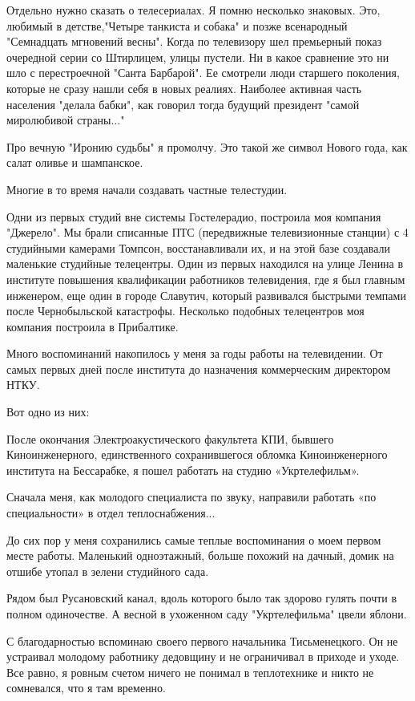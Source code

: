 Отдельно нужно сказать о телесериалах. Я помню несколько знаковых. Это, любимый
в детстве,"Четыре танкиста и собака" и позже всенародный "Семнадцать мгновений
весны". Когда по телевизору шел премьерный показ очередной серии со Штирлицем,
улицы пустели. Ни в какое сравнение это ни шло с перестроечной "Санта
Барбарой". Ее смотрели люди старшего поколения, которые не сразу нашли себя в
новых реалиях. Наиболее активная часть населения "делала бабки", как говорил
тогда будущий президент "самой миролюбивой страны..."

Про вечную "Иронию судьбы" я промолчу. Это такой же символ Нового года, как
салат оливье и шампанское. 

Многие в то время начали создавать частные телестудии.

Одни из первых студий вне системы Гостелерадио, построила моя компания
"Джерело". Мы брали списанные ПТС (передвижные телевизионные станции) с 4
студийными камерами Томпсон, восстанавливали их, и на этой базе создавали
маленькие студийные телецентры. Один из первых находился на улице Ленина в
институте повышения квалификации работников телевидения, где я был главным
инженером, еще один в городе Славутич, который развивался быстрыми темпами
после Чернобыльской катастрофы. Несколько подобных телецентров моя компания
построила в Прибалтике.

Много воспоминаний накопилось у меня за годы работы на телевидении. От самых
первых дней после института до назначения коммерческим директором НТКУ.

Вот одно из них:

 После окончания Электроакустического факультета КПИ, бывшего Киноинженерного,
 единственного сохранившегося обломка Киноинженерного института на Бессарабке,
 я пошел работать на студию «Укртелефильм».

Сначала меня, как молодого специалиста по звуку, направили работать «по
специальности» в отдел теплоснабжения...

До сих пор у меня сохранились самые теплые воспоминания о моем первом месте
работы. Маленький одноэтажный, больше похожий на дачный, домик на отшибе утопал
в зелени студийного сада.

Рядом был Русановский канал, вдоль которого было так здорово гулять почти в
полном одиночестве. А весной в ухоженном саду "Укртелефильма" цвели яблони.

С благодарностью вспоминаю своего первого начальника Тисьменецкого. Он не
устраивал молодому работнику дедовщину и не ограничивал в приходе и уходе. Все
равно, я ровным счетом ничего не понимал в теплотехнике и никто не сомневался,
что я там временно.

